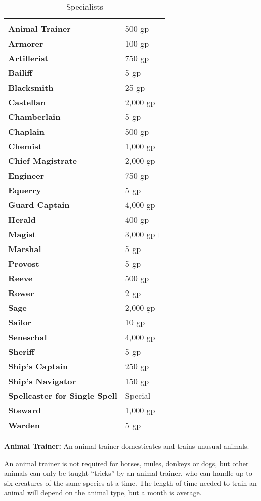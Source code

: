 \begin{multicols*}{2}
\begin {table}[H]
  \caption{Specialists}\label{tab:Specialists}
  \begin{tabularx}{\columnwidth}{>{\bfseries}YY}
		 & \\
		Animal Trainer & 500 gp\\
		Armorer & 100 gp\\
		Artillerist & 750 gp\\
		Bailiff & 5 gp\\
		Blacksmith & 25 gp\\
		Castellan & 2,000 gp\\
		Chamberlain & 5 gp\\
		Chaplain & 500 gp\\
		Chemist & 1,000 gp\\
		Chief Magistrate & 2,000 gp\\
		Engineer & 750 gp\\
		Equerry & 5 gp\\
		Guard Captain & 4,000 gp\\
		Herald & 400 gp\\
		Magist & 3,000 gp+\\
		Marshal & 5 gp\\
		Provost & 5 gp\\
		Reeve & 500 gp\\
		Rower & 2 gp\\
		Sage & 2,000 gp\\
		Sailor & 10 gp\\
		Seneschal & 4,000 gp\\
		Sheriff & 5 gp\\
		Ship’s Captain & 250 gp\\
		Ship’s Navigator & 150 gp\\
		Spellcaster for Single Spell & Special\\
		Steward & 1,000 gp\\
		Warden & 5 gp\
  \end {tabularx}
\end {table}

\textbf{Animal Trainer:} An animal trainer domesticates and trains unusual animals.

An animal trainer is not required for horses, mules, donkeys or dogs, but other animals can only be taught “tricks” by an animal trainer, who can handle up to six creatures of the same species at a time. The length of time needed to train an animal will depend on the animal type, but a month is average.


\end{multicols*}
